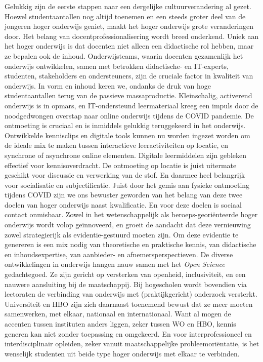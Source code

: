 \documentclass[smallauthor, chapterhaspagenum, nochapterinheader, pagenuminheader,  bigchapnum,medium2, tocpages,  garamond, titleinheader]{jote-book}
\begin{document}
	Gelukkig zijn de eerste stappen naar een dergelijke cultuurverandering al gezet. Hoewel studentaantallen nog altijd toenemen en een steeds groter deel van de jongeren hoger onderwijs geniet, maakt het hoger onderwijs grote veranderingen door. Het belang van docentprofessionalisering wordt breed onderkend. Uniek aan het hoger onderwijs is dat docenten niet alleen een didactische rol hebben, maar ze bepalen ook de inhoud. Onderwijsteams, waarin docenten gezamenlijk het onderwijs ontwikkelen, samen met betrokken didactische- en IT-experts, studenten, stakeholders en ondersteuners, zijn de cruciale factor in kwaliteit van onderwijs. In vorm en inhoud keren we, ondanks de druk van hoge studentaantallen terug van de passieve massaproductie. Kleinschalig, activerend onderwijs is in opmars, en IT-ondersteund leermateriaal kreeg een impuls door de noodgedwongen overstap naar online onderwijs tijdens de COVID pandemie. De ontmoeting is cruciaal en is inmiddels gelukkig teruggekeerd in het onderwijs. Ontwikkelde kennisclips en digitale tools kunnen nu worden ingezet worden om de ideale mix te maken tussen interactieve leeractiviteiten op locatie, en synchrone of asynchrone online elementen. Digitale leermiddelen zijn gebleken effectief voor kennisoverdracht. De ontmoeting op locatie is juist uitermate geschikt voor discussie en verwerking van de stof. En daarmee heel belangrijk voor socialisatie en subjectificatie. Juist door het gemis aan fysieke ontmoeting tijdens COVID zijn we ons bewuster geworden van het belang van deze twee doelen van hoger onderwijs naast kwalificatie. En voor deze doelen is sociaal contact onmisbaar. Zowel in het wetenschappelijk als beroeps-georiënteerde hoger onderwijs wordt volop geïnnoveerd, en groeit de aandacht dat deze vernieuwing zowel strategierijk als evidentie-gestuurd moeten zijn. Om deze evidentie te genereren is een mix nodig van theoretische en praktische kennis, van didactische en inhoudsexpertise, van aanbieder- en afnemersperspectieven. De diverse ontwikkelingen in onderwijs hangen nauw samen met het \emph{Open }\emph{Science} gedachtegoed. Ze zijn gericht op versterken van openheid, inclusiviteit, en een nauwere aansluiting bij de maatschappij. Bij hogescholen wordt bovendien via lectoraten de verbinding van onderwijs met (praktijkgericht) onderzoek versterkt. Universiteit en HBO zijn zich daarnaast toenemend bewust dat ze meer moeten samenwerken, met elkaar, nationaal en internationaal. Want al mogen de accenten tussen instituten anders liggen, zeker tussen WO en HBO, kennis generen kan niet zonder toepassing en omgekeerd. En voor interprofessioneel en interdisciplinair opleiden, zeker vanuit maatschappelijke probleemoriëntatie, is het wenselijk studenten uit beide type hoger onderwijs met elkaar te verbinden.
\end{document}

